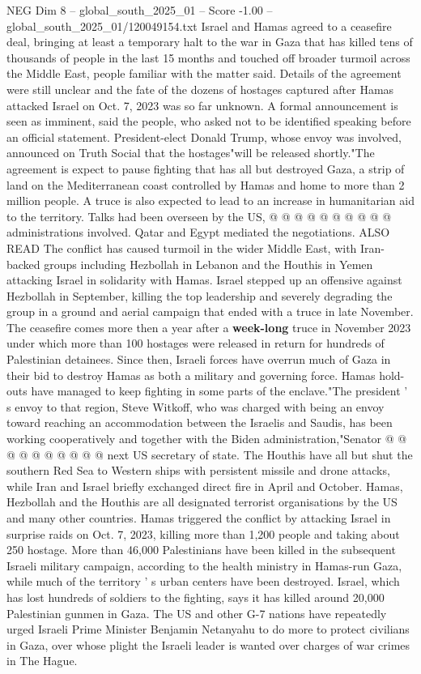 \begin{textsample}{NEG Dim 8 – global\_south\_2025\_01 – Score -1.00 – global\_south\_2025\_01/120049154.txt}  \label{ex:f8_neg_332}
Israel and Hamas agreed to a ceasefire deal, bringing at least a temporary halt to the war in Gaza that has killed tens of thousands of people in the last 15 months and touched off broader turmoil across the Middle East, people familiar with the matter said.
Details of the agreement were still unclear and the fate of the dozens of hostages captured after Hamas attacked Israel on Oct. 7, 2023 was so far unknown.
A formal announcement is seen as imminent, said the people, who asked not to be identified speaking before an official statement.
President-elect Donald Trump, whose envoy was involved, announced on Truth Social that the hostages"will be released shortly."The agreement is expect to pause fighting that has all but destroyed Gaza, a strip of land on the Mediterranean coast controlled by Hamas and home to more than 2 million people.
A truce is also expected to lead to an increase in humanitarian aid to the territory.
Talks had been overseen by the US, @ @ @ @ @ @ @ @ @ @ administrations involved.
Qatar and Egypt mediated the negotiations.
ALSO READ The conflict has caused turmoil in the wider Middle East, with Iran-backed groups including Hezbollah in Lebanon and the Houthis in Yemen attacking Israel in solidarity with Hamas.
Israel stepped up an offensive against Hezbollah in September, killing the top leadership and severely degrading the group in a ground and aerial campaign that ended with a truce in late November.
The ceasefire comes more then a year after a \textbf{week-long} truce in November 2023 under which more than 100 hostages were released in return for hundreds of Palestinian detainees.
Since then, Israeli forces have overrun much of Gaza in their bid to destroy Hamas as both a military and governing force.
Hamas hold-outs have managed to keep fighting in some parts of the enclave."The president ' s envoy to that region, Steve Witkoff, who was charged with being an envoy toward reaching an accommodation between the Israelis and Saudis, has been working cooperatively and together with the Biden administration,"Senator @ @ @ @ @ @ @ @ @ @ next US secretary of state.
The Houthis have all but shut the southern Red Sea to Western ships with persistent missile and drone attacks, while Iran and Israel briefly exchanged direct fire in April and October.
Hamas, Hezbollah and the Houthis are all designated terrorist organisations by the US and many other countries.
Hamas triggered the conflict by attacking Israel in surprise raids on Oct. 7, 2023, killing more than 1,200 people and taking about 250 hostage.
More than 46,000 Palestinians have been killed in the subsequent Israeli military campaign, according to the health ministry in Hamas-run Gaza, while much of the territory ' s urban centers have been destroyed.
Israel, which has lost hundreds of soldiers to the fighting, says it has killed around 20,000 Palestinian gunmen in Gaza.
The US and other G-7 nations have repeatedly urged Israeli Prime Minister Benjamin Netanyahu to do more to protect civilians in Gaza, over whose plight the Israeli leader is wanted over charges of war crimes in The Hague.

\end{textsample}
